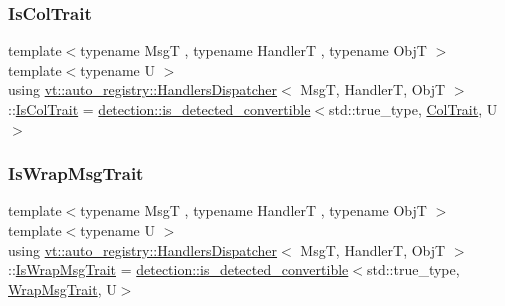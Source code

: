 \subsubsection{\texorpdfstring{Is\+Col\+Trait}{IsColTrait}}
{\footnotesize\ttfamily template$<$typename MsgT , typename HandlerT , typename ObjT $>$ \\
template$<$typename U $>$ \\
using \hyperlink{structvt_1_1auto__registry_1_1_handlers_dispatcher}{vt\+::auto\+\_\+registry\+::\+Handlers\+Dispatcher}$<$ MsgT, HandlerT, ObjT $>$\+::\hyperlink{structvt_1_1auto__registry_1_1_handlers_dispatcher_aa5e51c30b4d5124a98d04bdc2be043ac}{Is\+Col\+Trait} =  \hyperlink{namespacedetection_afb970b23e39cfecb33449d40242c49ff}{detection\+::is\+\_\+detected\+\_\+convertible}$<$std\+::true\+\_\+type, \hyperlink{structvt_1_1auto__registry_1_1_handlers_dispatcher_a0d707c7f0650f1185b5628aa71a98c87}{Col\+Trait}, U$>$}

\mbox{\label{structvt_1_1auto__registry_1_1_handlers_dispatcher_ad4c44b0bdc40d4ea339a1a1a3c1a3351}} 
\subsubsection{\texorpdfstring{Is\+Wrap\+Msg\+Trait}{IsWrapMsgTrait}}
{\footnotesize\ttfamily template$<$typename MsgT , typename HandlerT , typename ObjT $>$ \\
template$<$typename U $>$ \\
using \hyperlink{structvt_1_1auto__registry_1_1_handlers_dispatcher}{vt\+::auto\+\_\+registry\+::\+Handlers\+Dispatcher}$<$ MsgT, HandlerT, ObjT $>$\+::\hyperlink{structvt_1_1auto__registry_1_1_handlers_dispatcher_ad4c44b0bdc40d4ea339a1a1a3c1a3351}{Is\+Wrap\+Msg\+Trait} =  \hyperlink{namespacedetection_afb970b23e39cfecb33449d40242c49ff}{detection\+::is\+\_\+detected\+\_\+convertible}$<$std\+::true\+\_\+type, \hyperlink{structvt_1_1auto__registry_1_1_handlers_dispatcher_a316ed070238aa9a3bc8dd3f8d00109f2}{Wrap\+Msg\+Trait}, U$>$}

\mbox{\label{structvt_1_1auto__registry_1_1_handlers_dispatcher_a316ed070238aa9a3bc8dd3f8d00109f2}} 
